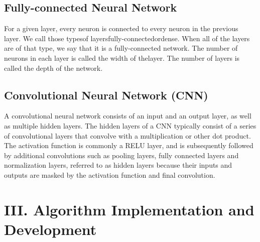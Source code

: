 \documentclass[12pt,letterpaper]{article}
\begin{document}
\subsection*{Fully-connected Neural Network}
For a given layer, every neuron is connected to every neuron in the previous layer.  We call those typesof layersfully-connectedordense.  When all of the layers are of that type, we say that it is a fully-connected network. The number of neurons in each layer is called the width of thelayer.  The number of layers is called the depth of the network. 
\subsection*{Convolutional Neural Network (CNN)}
A convolutional neural network consists of an input and an output layer, as well as multiple hidden layers. The hidden layers of a CNN typically consist of a series of convolutional layers that convolve with a multiplication or other dot product. The activation function is commonly a RELU layer, and is subsequently followed by additional convolutions such as pooling layers, fully connected layers and normalization layers, referred to as hidden layers because their inputs and outputs are masked by the activation function and final convolution.

\section*{III. Algorithm Implementation and Development}
\end{document}
